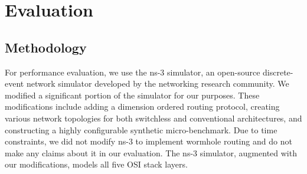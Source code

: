 \vspace{-0.1in}
\section{Evaluation}
\label{sec:eval}


\subsection {Methodology}
For performance evaluation, we use the ns-3 simulator\cite{Ns3:Online}, an open-source discrete-event network simulator developed by the networking research community. We modified a significant portion of the simulator for our purposes. These modifications include adding a dimension ordered routing protocol, creating various network topologies for both switchless and conventional architectures, and constructing a highly configurable synthetic micro-benchmark.  Due to time constraints, we did not modify ns-3 to implement wormhole routing and do not make any claims about it in our evaluation.  The ns-3 simulator, augmented with our modifications, models all five OSI stack layers.


